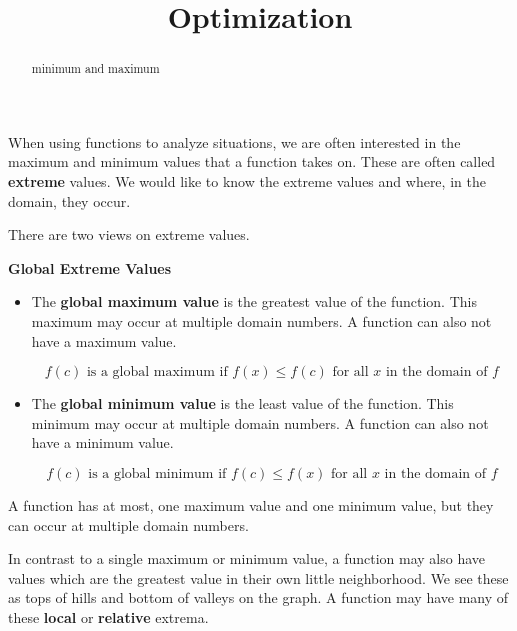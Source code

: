 \documentclass{ximera}
\title{Optimization}
\begin{document}
\begin{abstract}
minimum and maximum
\end{abstract}
\maketitle



When using functions to analyze situations, we are often interested in the maximum and minimum values that a function takes on. These are often called \textbf{extreme} values. We would like to know the extreme values and where, in the domain, they occur.



There are two views on extreme values.

\begin{definition} \textbf{\textcolor{green!50!black}{Global Extreme Values}} 

\begin{itemize}
\item The \textbf{global maximum value} is the greatest value of the function.  This maximum may occur at multiple domain numbers.  A function can also not have a maximum value.

\[  f(c) \text{ is a global maximum if } f(x) \leq f(c) \text{ for all } x \text{ in the domain of } f \]

\item The \textbf{global minimum value} is the least value of the function.  This minimum may occur at multiple domain numbers.  A function can also not have a minimum value.

\[  f(c) \text{ is a global minimum if } f(c) \leq f(x) \text{ for all } x \text{ in the domain of } f \]
\end{itemize}

A function has at most, one maximum value and one minimum value, but they can occur at multiple domain numbers.



\end{definition}



In contrast to a single maximum or minimum value, a function may also have values which are the greatest value in their own little neighborhood.  We see these as tops of hills and bottom of valleys on the graph.  A function may have many of these \textbf{local} or \textbf{relative} extrema.
\end{document}
